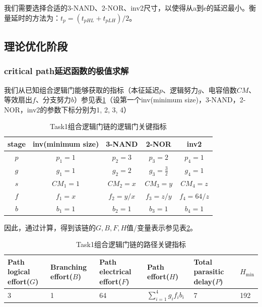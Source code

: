 \documentclass[UTF8,12pt,a4paper]{ctexart}
\begin{document}
我们需要选择合适的3-NAND、2-NOR、inv2尺寸，以使得从a到e的延迟最小。衡量延时的方法为：$t_p = (t_{pHL} + t_{pLH})/2$。

\subsection{理论优化阶段}

\subsubsection{critical path延迟函数的极值求解}

我们从已知组合逻辑门能够获取的指标（本征延迟$p$、逻辑努力$g$、电容倍数$CM$、等效扇出$f$、分支努力$b$）参见表\ref{tab:task1_metrics}（设第一个inv(minimum size)，3-NAND，2-NOR，inv2的参数下标分别为1, 2, 3, 4）

\begin{table}[htbp]
    \centering
    \caption{Task1组合逻辑门链的逻辑门关键指标}
    \label{tab:task1_metrics}
    \begin{tabular}{ccccc}
    \toprule
    stage & inv(minimum size) & 3-NAND & 2-NOR & inv2 \\
    \midrule
    $p$ & $p_1 = 1$ & $p_2 = 3$ & $p_3 = 2$ & $p_4 = 1$ \\
    $g$ & $g_1 = 1$ & $g_2 = 2$ & $g_3 = \frac{3}{2}$ & $g_4 = 1$ \\
    $s$ & $CM_1 = 1$ & $CM_2 = x$ & $CM_3 = y$ & $CM_4 = z$ \\
    $f$ & $f_1 = x$ & $f_2 = y/x$ & $f_3 = z/y$ & $f_4 = 64/z$ \\
    $b$ & $b_1 = 1$ & $b_2 = 1$ & $b_3 = 1$ & $b_4 = 1$ \\
    \bottomrule
    \end{tabular}
\end{table}

因此，通过计算，得到该链的$G,B,F,H$值/变量表示参见表\ref{tab:task1_path_metrics}。

\begin{table}[htbp]
    \centering
    \caption{Task1组合逻辑门链的路径关键指标}
    \label{tab:task1_path_metrics}
    \begin{tabularx}{\linewidth}{XXXXXX}
    \toprule
    Path logical effort($G$) & Branching effort($B$) &
    Path electrical effort($F$) & Path effort($H$) &
    Total parasitic delay($P$) & $H_{\text{min}}$ \\
    \midrule
    3 & 1 & 64 & $\sum_{i=1}^4{g_i f_i b_i}$ & 7 & 192  \\
    \bottomrule
    \end{tabularx}
\end{table}
\end{document}
